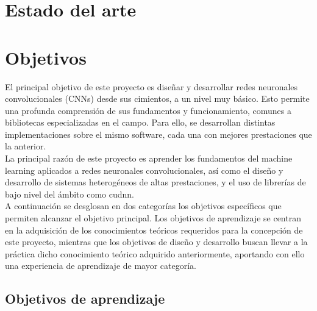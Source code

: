 \section{Estado del arte}
\section{Objetivos}


El principal objetivo de este proyecto es diseñar y desarrollar redes neuronales convolucionales (CNNs) desde sus cimientos, a un nivel muy básico. Esto permite una profunda comprensión de sus fundamentos y funcionamiento, comunes a bibliotecas especializadas en el campo. Para ello, se desarrollan distintas implementaciones sobre el mismo software, cada una con mejores prestaciones que la anterior. \\
La principal razón de este proyecto es aprender los fundamentos del machine learning aplicados a redes neuronales convolucionales, así como el diseño y desarrollo de sistemas heterogéneos de altas prestaciones, y el uso de librerías de bajo nivel del ámbito como cudnn. \\
A continuación se desglosan en dos categorías los objetivos específicos que permiten alcanzar el objetivo principal. Los objetivos de aprendizaje se centran en la adquisición de los conocimientos teóricos requeridos para la concepción de este proyecto, mientras que los objetivos de diseño y desarrollo buscan llevar a la práctica dicho conocimiento teórico adquirido anteriormente, aportando con ello una experiencia de aprendizaje de mayor categoría.

\subsection{Objetivos de aprendizaje}

